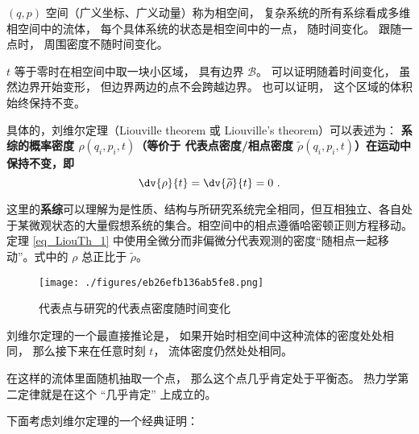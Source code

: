 

$(q, p)$ 空间（广义坐标、广义动量）称为相空间， 复杂系统的所有系综看成多维相空间中的流体， 每个具体系统的状态是相空间中的一点， 随时间变化。 跟随一点时， 周围密度不随时间变化。

$t$ 等于零时在相空间中取一块小区域， 具有边界 $\mathcal B$。 可以证明随着时间变化， 虽然边界开始变形， 但边界两边的点不会跨越边界。 也可以证明， 这个区域的体积始终保持不变。

具体的，刘维尔定理（Liouville theorem 或 Liouville's theorem）可以表述为：
\textbf{系综的概率密度 $\rho(q_i, p_i, t)$（等价于 代表点密度/相点密度 $\widetilde \rho(q_i, p_i, t)$）在运动中保持不变，即}
\begin{equation}\label{eq_LiouTh_1}
\dv{\rho}{t} = \dv{\widetilde{\rho}}{t} = 0 ~.
\end{equation}

这里的\textbf{系综}可以理解为是性质、结构与所研究系统完全相同，但互相独立、各自处于某微观状态的大量假想系统的集合。相空间中的相点遵循哈密顿正则方程移动。定理 \autoref{eq_LiouTh_1} 中使用全微分而非偏微分代表观测的密度“随相点一起移动”。式中的 $\rho$ 总正比于 $\widetilde \rho$。

\begin{figure}[ht]
\centering
\texttt{[image: ./figures/eb26efb136ab5fe8.png]}
\caption{代表点与研究的代表点密度随时间变化} \label{fig_LiouTh_2}
\end{figure}




刘维尔定理的一个最直接推论是， 如果开始时相空间中这种流体的密度处处相同， 那么接下来在任意时刻 $t$， 流体密度仍然处处相同。

在这样的流体里面随机抽取一个点， 那么这个点几乎肯定处于平衡态。 热力学第二定律就是在这个 “几乎肯定” 上成立的。


















下面考虑刘维尔定理的一个经典证明：

